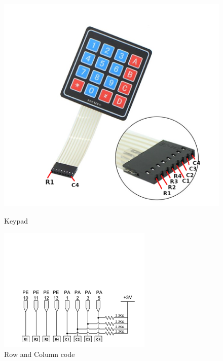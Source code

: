 \documentclass[12pt]{article}
\begin{document}
\begin{figure}[h!]
    \centering
    \begin{minipage}{0.45\textwidth}
        \centering
    \includegraphics[width=\textwidth]{Screenshot 2025-02-11 224311.png}
    \caption{Keypad}\end{minipage}
    \hfill
    \begin{minipage}{0.45\textwidth}
        \centering
    \includegraphics[width=\textwidth]{Screenshot 2025-02-11 224319.png}
    \caption{Row and Column code}
    \end{minipage}
\end{figure}
\end{document}
